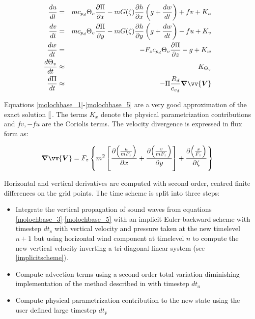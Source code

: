 \begin{eqnarray}
  \label{molochbase_1}
  \frac{du}{dt} &=& m c_{p_d}\Theta_v \frac{\partial \Pi}{\partial x}
                 -  m G(\zeta) \frac{\partial h}{\partial x}
                 \left(g + \frac{dw}{dt}\right) + fv + K_u \\
  \label{molochbase_2}
  \frac{dv}{dt} &=& m c_{p_d}\Theta_v \frac{\partial \Pi}{\partial y}
                 - m G(\zeta) \frac{\partial h}{\partial y}
                 \left(g + \frac{dw}{dt}\right) - fu + K_v \\
  \label{molochbase_3}
  \frac{dw}{dt} &=& - F_z c_{p_d}\Theta_v \frac{\partial \Pi}{\partial z}
                 - g + K_w \\
  \label{molochbase_4}
  \frac{d\Theta_{v}}{dt} &\approx& K_{\Theta_v} \\
  \label{molochbase_5}
  \frac{d\Pi}{dt} &\approx& -\Pi \frac{R_d}{c_{v_d}} \bm{\nabla} \vv{\bm{V}}
\end{eqnarray}

Equations \ref{molochbase_1}-\ref{molochbase_5} are a very good approximation
of the exact solution [\cite{Emanuel_94}]. The terms $K_x$ denote the physical
parametrization contributions and $fv,-fu$ are the Coriolis terms. The
velocity divergence is expressed in flux form as:

\begin{equation}
  \label{total_divergence}
  \bm{\nabla} \vv{\bm{V}} = F_z \left\{ m^2 \left[
    \frac{\partial{ \left(\frac{u}{m F_z} \right)}}{\partial x} +
    \frac{\partial{ \left(\frac{v}{m F_z} \right)}}{\partial y} \right] +
  \frac{\partial{ \left(\frac{s}{F_z} \right)}}{\partial \zeta} \right\}
\end{equation}

Horizontal and vertical derivatives are computed with second order, centred
finite differences on the grid points. The time scheme is split into three
steps:

\begin{itemize}
  \item Integrate the vertical propagation of sound waves from
    equations \ref{molochbase_3}-\ref{molochbase_5} with an implicit
    Euler-backward scheme with timestep $dt_s$ with vertical
    velocity and pressure taken at the new timelevel $n+1$ but using
    horizontal wind component at timelevel $n$ to compute the new vertical
    velocity inverting a tri-diagonal linear system (see
    \ref{implicitscheme}).
  \item Compute advection terms using a second order total variation 
    diminishing implementation of the \cite{Godunov_59} method
    described in \cite{hubbard2003three} with timestep $dt_a$
  \item Compute physical parametrization contribution to the new state
    using the user defined large timestep $dt_p$
\end{itemize}

